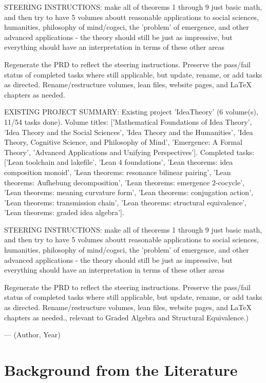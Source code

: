 {STEERING INSTRUCTIONS: make all of theorems 1 through 9 just basic math, and then try to have 5 volumes aboutt reasonable applications to social sciences, humanities, philosophy of mind/cogsci, the 'problem' of emergence, and other advanced applications - the theory should still be just as impressive, but everything should have an interpretation in terms of these other areas

Regenerate the PRD to reflect the steering instructions. Preserve the pass/fail status of completed tasks where still applicable, but update, rename, or add tasks as directed. Rename/restructure volumes, lean files, website pages, and LaTeX chapters as needed.

EXISTING PROJECT SUMMARY: Existing project 'IdeaTheory' (6 volume(s), 11/54 tasks done). Volume titles: ['Mathematical Foundations of Idea Theory', 'Idea Theory and the Social Sciences', 'Idea Theory and the Humanities', 'Idea Theory, Cognitive Science, and Philosophy of Mind', 'Emergence: A Formal Theory', 'Advanced Applications and Unifying Perspectives']. Completed tasks: ['Lean toolchain and lakefile', 'Lean 4 foundations', 'Lean theorems: idea composition monoid', 'Lean theorems: resonance bilinear pairing', 'Lean theorems: Aufhebung decomposition', 'Lean theorems: emergence 2-cocycle', 'Lean theorems: meaning curvature form', 'Lean theorems: conjugation action', 'Lean theorems: transmission chain', 'Lean theorems: structural equivalence', 'Lean theorems: graded idea algebra'].

STEERING INSTRUCTIONS: make all of theorems 1 through 9 just basic math, and then try to have 5 volumes aboutt reasonable applications to social sciences, humanities, philosophy of mind/cogsci, the 'problem' of emergence, and other advanced applications - the theory should still be just as impressive, but everything should have an interpretation in terms of these other areas

Regenerate the PRD to reflect the steering instructions. Preserve the pass/fail status of completed tasks where still applicable, but update, rename, or add tasks as directed. Rename/restructure volumes, lean files, website pages, and LaTeX chapters as needed., relevant to Graded Algebra and Structural Equivalence.)}{--- (Author, Year)}

        \section{Background from the Literature}
        \label{sec:v1c2.lit}

